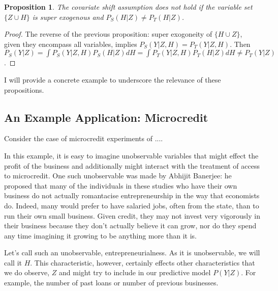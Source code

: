 \documentclass[a4paper,12pt]{article}
\newtheorem{prop}{Proposition}
\begin{document}
\begin{prop}
  The covariate shift assumption does not hold if the variable set $\{ Z \cup H \}$ is super exogenous and $P_S(H|Z) \neq P_T(H|Z)$.
\end{prop}

\begin{proof}
  The reverse of the previous proposition: super exogoneity of $\{H \cup Z \}$, given they encompass all variables, implies $P_S(Y|Z,H) = P_T(Y|Z,H)$. Then $P_S(Y|Z) = \int P_S(Y|Z,H)P_S(H|Z) dH = \int P_T(Y|Z,H)P_T(H|Z) dH \neq P_T(Y|Z)$.

\end{proof}



I will provide a concrete example to underscore the relevance of these propositions.

\subsection{An Example Application: Microcredit}

Consider the case of microcredit experiments of ....

In this example, it is easy to imagine unobservable variables that might effect the profit of the business and additionally might interact with the treatment of access to microcredit. One such unobservable was  made by Abhijit Banerjee: he proposed that many of the individuals in these studies who have their own business do not actually romantacise entrepreneurship in the way that economists do. Indeed, many would prefer to have salaried jobs, often from the state, than to run their own small business. Given credit, they may not invest very vigorously in their business because they don't actually believe it can grow, nor do they spend any time imagining it growing to be anything more than it is. 

Let's call such an unobservable, entrepreneurialness. As it is unobservable, we will call it $H$. This characteristic, however, certainly effects other characteristics that we do observe, $Z$ and might try to include in our predictive model $P(Y|Z)$. For example, the number of past loans or number of previous businesses. 
\end{document}
